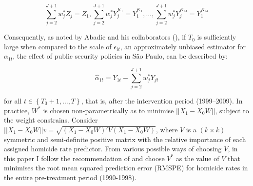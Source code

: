 $$\sum_{j = 2}^{J + 1} w_{j}^{*} Z_{j} = Z_{1}, \sum_{j = 2}^{J + 1} w_{j}^{*}\bar{Y}_{j}^{K_{1}} = \bar{Y}_{1}^{K_{1}}, \dots, \sum_{j = 2}^{J + 1} w_{j}^{*}\bar{Y}_{j}^{K_{M}} = \bar{Y}_{1}^{K_{M}}$$ 

Consequently, as noted by Abadie and his collaborators (\citeyear{abadie2010}), if $T_{0}$ is sufficiently large when compared to the scale of $\epsilon_{it}$, an approximately unbiased estimator for $\alpha_{1t}$, the effect of public security policies in São Paulo, can be described by:

$$\hat{\alpha}_{1t} = Y_{1t} - \sum_{j = 2}^{J + 1} w_{j}^{*} Y_{jt}$$

for all $t \in \left\{T_{0} + 1, \dots, T \right\}$, that is, after the intervention period (1999--2009). In practice, $W^{*}$ is chosen non-parametrically as to minimise $||X_{1} - X_{0}W||$, subject to the weight constrains. Consider $||X_{1} - X_{0}W||v = \sqrt{(X_{1} - X_{0}W)'V (X_{1} - X_{0}W)}$, where $V$ is a $(k \times k)$ symmetric and semi-definite positive matrix with the relative importance of each assigned homicide rate predictor. From various possible ways of choosing $V$, in this paper I follow the recommendation of \citet{abadie2003} and choose $V^{*}$ as the value of $V$ that minimises the root mean squared prediction error (RMSPE) for homicide rates in the entire pre-treatment period (1990-1998).
